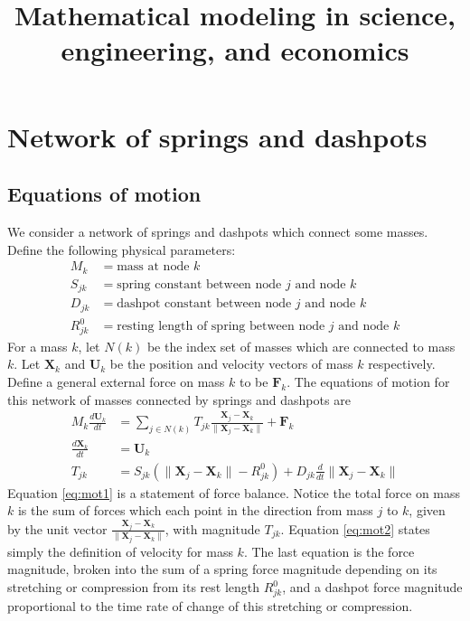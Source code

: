 \documentclass[10pt]{article}
\newcommand{\bs}[1]{{\boldsymbol #1}}
\begin{document}
\title{Mathematical modeling in science, engineering, and economics}
\maketitle

\tableofcontents

\newpage
\section{Network of springs and dashpots}

\subsection{Equations of motion}
We consider a network of springs and dashpots which connect some masses.  Define the following physical parameters:
\begin{align*}
M_k &= \text{mass at node }k \\
S_{jk} &= \text{spring constant between node $j$ and node $k$} \\
D_{jk} &= \text{dashpot constant between node $j$ and node $k$} \\
R^0_{jk} &= \text{resting length of spring between node $j$ and node $k$} 
\end{align*}
For a mass $k$, let $N(k)$ be the index set of masses which are connected to mass $k$.  Let ${\bs X}_k$ and ${\bs U}_k$ be the position and velocity vectors of mass $k$ respectively.  Define a general external force on mass $k$ to be ${\bs F}_k$.  The equations of motion for this network of masses connected by springs and dashpots are
\begin{align}
\label{eq:mot1}
M_k \frac{d {\bs U}_k}{dt} &= \sum_{j \in N(k)} T_{jk} \frac{{\bs X}_j - {\bs X}_k}{\| {\bs X}_j - {\bs X}_k \|} + {\bs F}_k \\
\label{eq:mot2}
\frac{d {\bs X}_k}{dt} &= {\bs U}_k \\
\label{eq:mot3}
T_{jk} &= S_{jk} \left( \|{\bs X}_j - {\bs X}_k\| - R^0_{jk} \right) + D_{jk} \frac{d}{dt} \|{\bs X}_j - {\bs X}_k \|
\end{align}
Equation \eqref{eq:mot1} is a statement of force balance.  Notice the total force on mass $k$ is the sum of forces which each point in the direction from mass $j$ to $k$, given by the unit vector $\frac{{\bs X}_j - {\bs X}_k}{\| {\bs X}_j - {\bs X}_k \|}$, with magnitude $T_{jk}$.  Equation \eqref{eq:mot2} states simply the definition of velocity for mass $k$.  The last equation is the force magnitude, broken into the sum of a spring force magnitude depending on its stretching or compression from its rest length $R_{jk}^0$, and a dashpot force magnitude proportional to the time rate of change of this stretching or compression.
\end{document}
